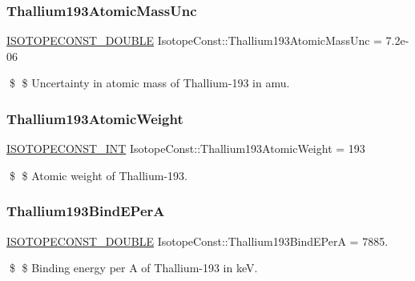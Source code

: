 \subsubsection{\texorpdfstring{Thallium193\+Atomic\+Mass\+Unc}{Thallium193AtomicMassUnc}}
{\footnotesize\ttfamily \mbox{\hyperlink{group___isotope_const-_macros_ga8f45a7272ce02c0b4c65c44636ed719a}{I\+S\+O\+T\+O\+P\+E\+C\+O\+N\+S\+T\+\_\+\+D\+O\+U\+B\+LE}} Isotope\+Const\+::\+Thallium193\+Atomic\+Mass\+Unc = 7.\+2e-\/06}

\$ \$ Uncertainty in atomic mass of Thallium-\/193 in amu. \mbox{\label{group___isotope_const-_thallium-_tl193_ga3d76a022da7aba9bbb983e5ed90b9e93}} 
\subsubsection{\texorpdfstring{Thallium193\+Atomic\+Weight}{Thallium193AtomicWeight}}
{\footnotesize\ttfamily \mbox{\hyperlink{group___isotope_const-_macros_ga5f18360b3e99483a35c32d789e62621c}{I\+S\+O\+T\+O\+P\+E\+C\+O\+N\+S\+T\+\_\+\+I\+NT}} Isotope\+Const\+::\+Thallium193\+Atomic\+Weight = 193}

\$ \$ Atomic weight of Thallium-\/193. \mbox{\label{group___isotope_const-_thallium-_tl193_ga4d897c8702120f636f71867a9060ea8b}} 
\subsubsection{\texorpdfstring{Thallium193\+Bind\+E\+PerA}{Thallium193BindEPerA}}
{\footnotesize\ttfamily \mbox{\hyperlink{group___isotope_const-_macros_ga8f45a7272ce02c0b4c65c44636ed719a}{I\+S\+O\+T\+O\+P\+E\+C\+O\+N\+S\+T\+\_\+\+D\+O\+U\+B\+LE}} Isotope\+Const\+::\+Thallium193\+Bind\+E\+PerA = 7885.}

\$ \$ Binding energy per A of Thallium-\/193 in keV. \mbox{\label{group___isotope_const-_thallium-_tl193_gaa9087777828ab54f98103e630c32b237}} 
